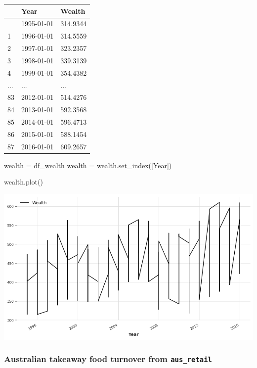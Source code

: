 \documentclass[
  11pt,
]{article}
\newenvironment{Shaded}{\begin{snugshade}}{\end{snugshade}}
\newcommand{\NormalTok}[1]{\textcolor[rgb]{0.00,0.23,0.31}{#1}}
\newcommand{\OperatorTok}[1]{\textcolor[rgb]{0.37,0.37,0.37}{#1}}
\newcommand{\StringTok}[1]{\textcolor[rgb]{0.13,0.47,0.30}{#1}}
\begin{document}
\begin{longtable}[]{@{}lll@{}}
\toprule\noalign{}
& Year & Wealth \\
\midrule\noalign{}
\endhead
\bottomrule\noalign{}
\endlastfoot
0 & 1995-01-01 & 314.9344 \\
1 & 1996-01-01 & 314.5559 \\
2 & 1997-01-01 & 323.2357 \\
3 & 1998-01-01 & 339.3139 \\
4 & 1999-01-01 & 354.4382 \\
... & ... & ... \\
83 & 2012-01-01 & 514.4276 \\
84 & 2013-01-01 & 592.3568 \\
85 & 2014-01-01 & 596.4713 \\
86 & 2015-01-01 & 588.1454 \\
87 & 2016-01-01 & 609.2657 \\
\end{longtable}

\begin{Shaded}
\begin{Highlighting}[]
\NormalTok{wealth }\OperatorTok{=}\NormalTok{ df\_wealth}
\NormalTok{wealth }\OperatorTok{=}\NormalTok{ wealth.set\_index([}\StringTok{\textquotesingle{}Year\textquotesingle{}}\NormalTok{])}

\NormalTok{wealth.plot()}
\end{Highlighting}
\end{Shaded}

\includegraphics{hw3_files/figure-pdf/cell-21-output-1.png}

\subsubsection{\texorpdfstring{Australian takeaway food turnover from
\texttt{aus\_retail}}{Australian takeaway food turnover from aus\_retail}}\label{australian-takeaway-food-turnover-from-aus_retail}
\end{document}
